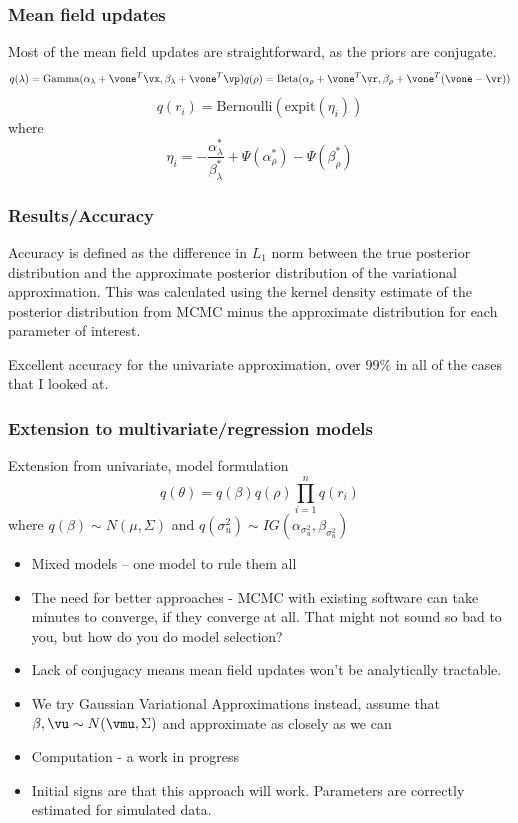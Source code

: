 \documentclass{beamer}
\begin{document}
\begin{frame}
\frametitle{Mean field updates}
Most of the mean field updates are straightforward, as the priors are conjugate.
$$
q(\lambda) = \text{Gamma}(\alpha_\lambda + \vone^T \vx, \beta_\lambda + \vone^T\vp)
q(\rho) = \text{Beta}(\alpha_\rho + \vone^T\vr, \beta_\rho + \vone^T(\vone - \vr))
$$
$$
q(r_i) = \text{Bernoulli}(\text{expit}(\eta_i))
$$
where
$$
\eta_i = - \frac{\alpha_\lambda^*}{\beta_\lambda^*} + \Psi(\alpha_\rho^*) - \Psi(\beta_\rho^*)
$$
\end{frame}

\begin{frame}
\frametitle{Results/Accuracy}
Accuracy is defined as the difference in $L_1$ norm between the true posterior distribution and
the approximate posterior distribution of the variational approximation. This was calculated
using the kernel density estimate of the posterior distribution from MCMC minus the approximate
distribution for each parameter of interest.

Excellent accuracy for the univariate approximation, over 99\% in all of the cases that I looked at.
\end{frame}

\begin{frame}
\frametitle{Extension to multivariate/regression models}
Extension from univariate, model formulation
$$
q(\theta) = q(\beta) q(\rho) \prod_{i=1}^n q(r_i)
$$
where
$q(\beta) \sim N(\mu, \Sigma)$ and
$q(\sigma_u^2) \sim IG(\alpha_{\sigma_u^2}, \beta_{\sigma_u^2})$

\begin{itemize}
\item Mixed models -- one model to rule them all
\item The need for better approaches - MCMC with existing software can take minutes to
converge, if they converge at all. That might not sound so bad to you, but how do you
do model selection?
\end{itemize}
\end{frame}

\begin{frame}
\begin{itemize}
\item Lack of conjugacy means mean field updates won't be analytically tractable.
\item We try Gaussian Variational Approximations instead, assume that $\beta, \vu \sim N(\vmu, \Sigma)$
and approximate as closely as we can
\item Computation - a work in progress
\item Initial signs are that this approach will work. Parameters are correctly estimated for simulated data.
\end{itemize}
\end{frame}
\end{document}
